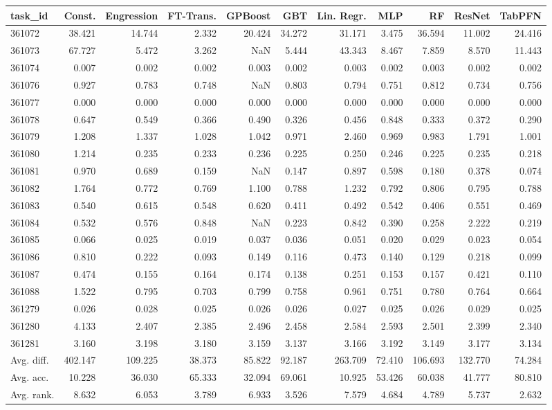 \begin{tabular}{lrrrrrrrrrr}
\toprule
task\_id & Const. & Engression & FT-Trans. & GPBoost & GBT & Lin. Regr. & MLP & RF & ResNet & TabPFN \\
\midrule
361072 & 38.421 & 14.744 & 2.332 & 20.424 & 34.272 & 31.171 & 3.475 & 36.594 & 11.002 & 24.416 \\
361073 & 67.727 & 5.472 & 3.262 & NaN & 5.444 & 43.343 & 8.467 & 7.859 & 8.570 & 11.443 \\
361074 & 0.007 & 0.002 & 0.002 & 0.003 & 0.002 & 0.003 & 0.002 & 0.003 & 0.002 & 0.002 \\
361076 & 0.927 & 0.783 & 0.748 & NaN & 0.803 & 0.794 & 0.751 & 0.812 & 0.734 & 0.756 \\
361077 & 0.000 & 0.000 & 0.000 & 0.000 & 0.000 & 0.000 & 0.000 & 0.000 & 0.000 & 0.000 \\
361078 & 0.647 & 0.549 & 0.366 & 0.490 & 0.326 & 0.456 & 0.848 & 0.333 & 0.372 & 0.290 \\
361079 & 1.208 & 1.337 & 1.028 & 1.042 & 0.971 & 2.460 & 0.969 & 0.983 & 1.791 & 1.001 \\
361080 & 1.214 & 0.235 & 0.233 & 0.236 & 0.225 & 0.250 & 0.246 & 0.225 & 0.235 & 0.218 \\
361081 & 0.970 & 0.689 & 0.159 & NaN & 0.147 & 0.897 & 0.598 & 0.180 & 0.378 & 0.074 \\
361082 & 1.764 & 0.772 & 0.769 & 1.100 & 0.788 & 1.232 & 0.792 & 0.806 & 0.795 & 0.788 \\
361083 & 0.540 & 0.615 & 0.548 & 0.620 & 0.411 & 0.492 & 0.542 & 0.406 & 0.551 & 0.469 \\
361084 & 0.532 & 0.576 & 0.848 & NaN & 0.223 & 0.842 & 0.390 & 0.258 & 2.222 & 0.219 \\
361085 & 0.066 & 0.025 & 0.019 & 0.037 & 0.036 & 0.051 & 0.020 & 0.029 & 0.023 & 0.054 \\
361086 & 0.810 & 0.222 & 0.093 & 0.149 & 0.116 & 0.473 & 0.140 & 0.129 & 0.218 & 0.099 \\
361087 & 0.474 & 0.155 & 0.164 & 0.174 & 0.138 & 0.251 & 0.153 & 0.157 & 0.421 & 0.110 \\
361088 & 1.522 & 0.795 & 0.703 & 0.799 & 0.758 & 0.961 & 0.751 & 0.780 & 0.764 & 0.664 \\
361279 & 0.026 & 0.028 & 0.025 & 0.026 & 0.026 & 0.027 & 0.025 & 0.026 & 0.029 & 0.025 \\
361280 & 4.133 & 2.407 & 2.385 & 2.496 & 2.458 & 2.584 & 2.593 & 2.501 & 2.399 & 2.340 \\
361281 & 3.160 & 3.198 & 3.180 & 3.159 & 3.137 & 3.166 & 3.192 & 3.149 & 3.177 & 3.134 \\
Avg. diff. & 402.147 & 109.225 & 38.373 & 85.822 & 92.187 & 263.709 & 72.410 & 106.693 & 132.770 & 74.284 \\
Avg. acc. & 10.228 & 36.030 & 65.333 & 32.094 & 69.061 & 10.925 & 53.426 & 60.038 & 41.777 & 80.810 \\
Avg. rank. & 8.632 & 6.053 & 3.789 & 6.933 & 3.526 & 7.579 & 4.684 & 4.789 & 5.737 & 2.632 \\
\bottomrule
\end{tabular}

